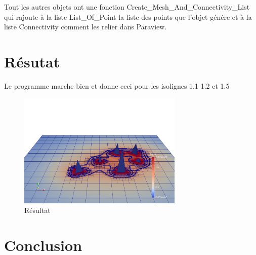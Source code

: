 \documentclass[french]{article}
\begin{document}
Tout les autres objets ont une fonction Create\_Mesh\_And\_Connectivity\_List qui rajoute à la liste List\_Of\_Point la liste des points
que l'objet génére et à la liste Connectivity comment les relier dans Paraview.

\section{Résutat}
Le programme marche bien et donne ceci pour les isolignes 1.1 1.2 et 1.5

\begin{figure}[h]
	\centering
	\includegraphics[width=0.7\textwidth]{Figures/Finalwhite2.png}
	\caption{Résultat}
\end{figure}

\section{Conclusion}
\end{document}
